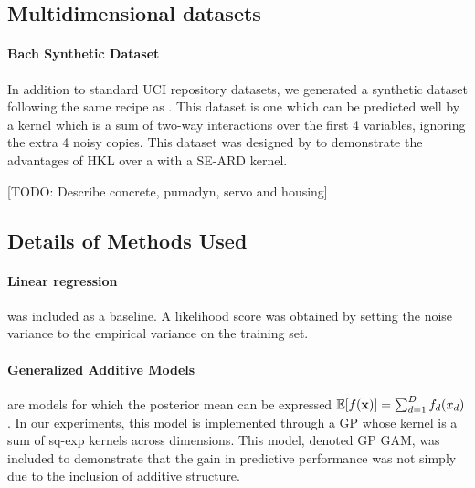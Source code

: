 \documentclass[twoside]{article}
\begin{document}
\subsection{Multidimensional datasets}

\paragraph{Bach Synthetic Dataset}
In addition to standard UCI repository datasets, we generated a synthetic dataset following the same recipe as \cite{DBLP:journals/corr/abs-0909-0844}.
This dataset is one which can be predicted well by a kernel which is a sum of two-way interactions over the first 4 variables, ignoring the extra 4 noisy copies.
%
This dataset was designed by \cite{DBLP:journals/corr/abs-0909-0844} to demonstrate the advantages of HKL over a \gp{} with a SE-ARD kernel. 


[TODO: Describe concrete, pumadyn, servo and housing]

\subsection{Details of Methods Used}

\paragraph{Linear regression} was included as a baseline. A likelihood score was obtained by setting the noise variance to the empirical variance on the training set.

\paragraph{Generalized Additive Models} are models for which the posterior mean can be expressed $\mathbb{E}[f({\bf{x}})] = \sum_{d=1}^D f_d(x_d)$.  
In our experiments, this model is implemented through a GP whose kernel is a sum of sq-exp kernels across dimensions.  
This model, denoted GP GAM, was included to demonstrate that the gain in predictive performance was not simply due to the inclusion of additive structure.
\end{document}
